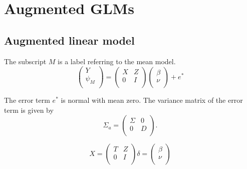 \documentclass[12pt, a4paper]{article}
\begin{document}



\section{Augmented GLMs}
\subsection{Augmented linear model}
The subscript $M$ is a label referring to the mean model.
\begin{equation}
\left(%
\begin{array}{c}
Y \\
\psi_{M} \\
\end{array}%
\right) = \left(
\begin{array}{cc}
X & Z \\
0 & I \\
\end{array}\right) \left(%
\begin{array}{c}
\beta \\
\nu \\
\end{array}%
\right)+ e^{*}
\end{equation}




The error term $e^{*}$ is normal with mean zero. The variance
matrix of the error term is given by
\begin{equation}
\Sigma_{a} = \left(%
\begin{array}{cc}
\Sigma & 0 \\
0 & D \\
\end{array}%
\right).
\end{equation}

\begin{equation}
X = \left(%
\begin{array}{cc}
T & Z \\
0 & I \\
\end{array}%
\right)
\delta = \left(%
\begin{array}{c}
\beta  \\
\nu  \\
\end{array}%
\right)
\end{equation}
\end{document}
